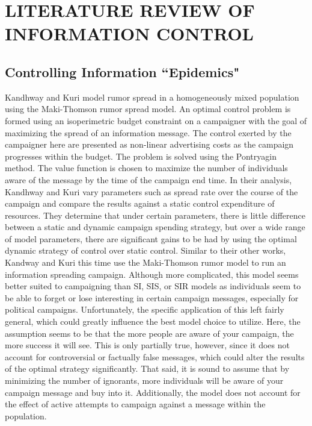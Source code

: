 \chapter{LITERATURE REVIEW OF INFORMATION CONTROL}%

\section{Controlling Information ``Epidemics"}
Kandhway and Kuri model rumor spread in a homogeneously mixed population using the Maki-Thomson rumor spread model. An optimal control problem is formed using an isoperimetric budget constraint on a campaigner with the goal of maximizing the spread of an information message. The control exerted by the campaigner here are presented as non-linear advertising costs as the campaign progresses within the budget. The problem is solved using the Pontryagin method. The value function is chosen to maximize the number of individuals aware of the message by the time of the campaign end time. In their analysis, Kandhway and Kuri vary parameters such as spread rate over the course of the campaign and compare the results against a static control expenditure of resources. They determine that under certain parameters, there is little difference between a static and dynamic campaign spending strategy, but over a wide range of model parameters, there are significant gains to be had by using the optimal dynamic strategy of control over static control. \cite{kandhway2014optimal}
Similar to their other works, Kandway and Kuri this time use the Maki-Thomson rumor model to run an information spreading campaign. Although more complicated, this model seems better suited to campaigning than SI, SIS, or SIR models as individuals seem to be able to forget or lose interesting in certain campaign messages, especially for political campaigns. Unfortunately, the specific application of this left fairly general, which could greatly influence the best model choice to utilize. Here, the assumption seems to be that the more people are aware of your campaign, the more success it will see. This is only partially true, however, since it does not account for controversial or factually false messages, which could alter the results of the optimal strategy significantly. That said, it is sound to assume that by minimizing the number of ignorants, more individuals will be aware of your campaign message and buy into it. Additionally, the model does not account for the effect of active attempts to campaign against a message within the population.

